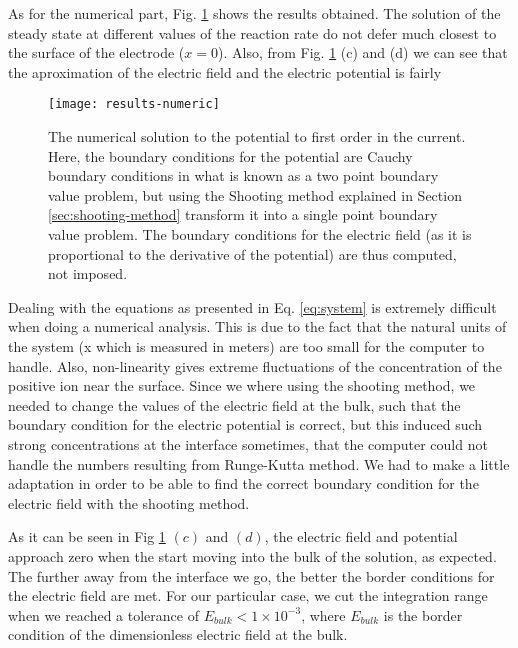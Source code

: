 As for the numerical part, Fig. \ref{fig:numeric-results} shows the results obtained. The solution of the steady state at different values of the reaction rate do not defer much closest to the surface of the electrode ($x=0$). Also, from Fig. \ref{fig:numeric-results} (c) and (d) we can see that the aproximation of the electric field and the electric potential is fairly 

\begin{figure}[htbp]
 \centering
\texttt{[image: results-numeric]}
 \caption{The numerical solution to the potential to first order in the current. Here, the boundary conditions for the potential are Cauchy boundary conditions in what is known as a two point boundary value problem, but using the Shooting method explained in Section \ref{sec:shooting-method} transform it into a single point boundary value problem. The boundary conditions for the electric field (as it is proportional to the derivative of the potential) are thus computed, not imposed.}
 \label{fig:numeric-results}
\end{figure}

Dealing with the equations as presented in Eq. \ref{eq:system} is extremely difficult when doing a numerical analysis. This is due to the fact that the natural units of the system (x which is measured in meters) are too small for the computer to handle. Also, non-linearity gives extreme fluctuations of the concentration of the positive ion near the surface. Since we where using the shooting method, we needed to change the values of the electric field at the bulk, such that the boundary condition for the electric potential is correct, but this induced such strong concentrations at the interface sometimes, that the computer could not handle the numbers resulting from Runge-Kutta method. We had to make a little adaptation in order to be able to find the correct boundary condition for the electric field with the shooting method. 




As it can be seen in Fig  \ref{fig:numeric-results} $(c)$ and $(d)$, the electric field and potential approach zero when the start moving into the bulk of the solution, as expected. The further away from the interface we go, the better the border conditions for the electric field are met. For our particular case, we cut the integration range when we reached a tolerance of $ E_{bulk} < 1\times 10^{-3}$, where $E_{bulk}$ is the border condition of the dimensionless electric field at the bulk. 



